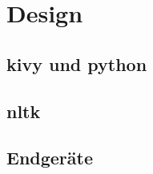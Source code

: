 \section{Design}

	\subsection{kivy und python}
	\subsection{nltk}
	\subsection{Endgeräte}
    \newpage